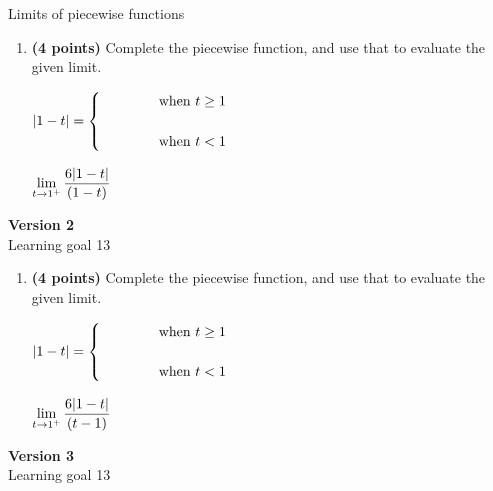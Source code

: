 \documentclass[12pt]{amsart}
\begin{document}
Limits of piecewise functions
\begin{enumerate}[resume]
\item {\bf (4 points)} 
 Complete the piecewise function, and use that to evaluate the given limit.

\vspace{.5cm}

$|1 - t| = \begin{cases} \hspace{1cm} & \text{ when } t \geq 1 \\ & \\ \hspace{1cm} & \text{ when } t < 1 \end{cases}$

\vspace{.5cm}

$\displaystyle \lim_{t \rightarrow \a^+} \frac{\ifthenelse{\ktop=1}{\k}{}\ifthenelse{\abstop=1}{|\a-t|}{(\a-t)}}{\ifthenelse{\ktop=0}{\k}{}\ifthenelse{\abstop=0}{|\a-t|}{(\a-t)}}$

\vfill 
 \end{enumerate}$ $ \\ {\bf Version 2} \\ 
Learning goal 13
\begin{enumerate}[resume]
\item {\bf (4 points)} 
 Complete the piecewise function, and use that to evaluate the given limit.

\vspace{.5cm}

$|1 - t| = \begin{cases} \hspace{1cm} & \text{ when } t \geq 1 \\ & \\ \hspace{1cm} & \text{ when } t < 1 \end{cases}$

\vspace{.5cm}

$\displaystyle \lim_{t \rightarrow \a^+} \frac{\ifthenelse{\ktop=1}{\k}{}\ifthenelse{\abstop=1}{|\a-t|}{(t-\a)}}{\ifthenelse{\ktop=0}{\k}{}\ifthenelse{\abstop=0}{|\a-t|}{(t-\a)}}$

\vfill 
 \end{enumerate}$ $ \\ {\bf Version 3} \\ 
Learning goal 13
\end{document}
